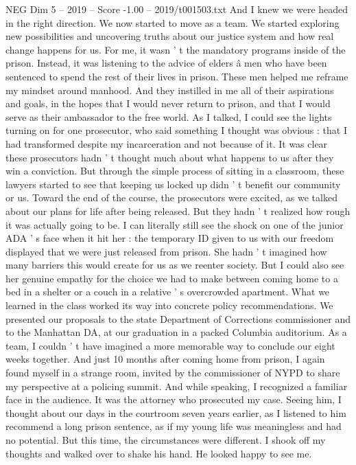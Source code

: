 \begin{textsample}{NEG Dim 5 – 2019 – Score -1.00 – 2019/t001503.txt}
And I knew we were headed in the right direction.
We now started to move as a team.
We started exploring new possibilities and uncovering truths about our justice system and how real change happens for us.
For me, it wasn ' t the mandatory programs inside of the prison.
Instead, it was listening to the advice of elders â men who have been sentenced to spend the rest of their lives in prison.
These men helped me reframe my mindset around manhood.
And they instilled in me all of their aspirations and goals, in the hopes that I would never return to prison, and that I would serve as their ambassador to the free world.
As I talked, I could see the lights turning on for one prosecutor, who said something I thought was obvious : that I had transformed despite my incarceration and not because of it.
It was clear these prosecutors hadn ' t thought much about what happens to us after they win a conviction.
But through the simple process of sitting in a classroom, these lawyers started to see that keeping us locked up didn ' t benefit our community or us.
Toward the end of the course, the prosecutors were excited, as we talked about our plans for life after being released.
But they hadn ' t realized how rough it was actually going to be.
I can literally still see the shock on one of the junior ADA ' s face when it hit her : the temporary ID given to us with our freedom displayed that we were just released from prison.
She hadn ' t imagined how many barriers this would create for us as we reenter society.
But I could also see her genuine empathy for the choice we had to make between coming home to a bed in a shelter or a couch in a relative ' s overcrowded apartment.
What we learned in the class worked its way into concrete policy recommendations.
We presented our proposals to the state Department of Corrections commissioner and to the Manhattan DA, at our graduation in a packed Columbia auditorium.
As a team, I couldn ' t have imagined a more memorable way to conclude our eight weeks together.
And just 10 months after coming home from prison, I again found myself in a strange room, invited by the commissioner of NYPD to share my perspective at a policing summit.
And while speaking, I recognized a familiar face in the audience.
It was the attorney who prosecuted my case.
Seeing him, I thought about our days in the courtroom seven years earlier, as I listened to him recommend a long prison sentence, as if my young life was meaningless and had no potential.
But this time, the circumstances were different.
I shook off my thoughts and walked over to shake his hand.
He looked happy to see me.

\end{textsample}
